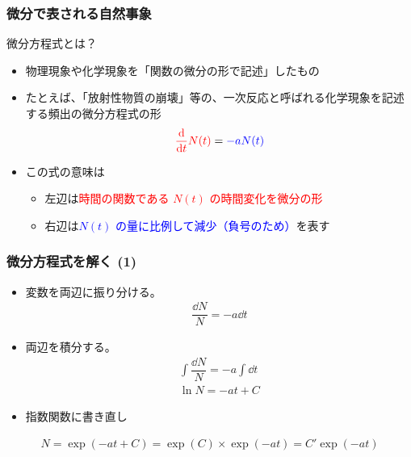 \documentclass[unicode,12pt,aspectratio=169]{beamer}
\begin{document}
\begin{frame}
	\frametitle{微分で表される自然事象}
		\vspace{-2mm}
		\begin{alertblock}{微分方程式とは？}
			\begin{itemize}
				\item 物理現象や化学現象を\alert{「関数の微分の形で記述」}したもの
			\end{itemize}
		\end{alertblock}
			\begin{itemize}
				\item<2-> たとえば、「放射性物質の崩壊」等の、一次反応と呼ばれる化学現象を記述する頻出の微分方程式の形
			\vspace{-2mm}
				\small{\begin{align*}
					\textcolor{red}{\dv{t} N(t)} = \textcolor{blue}{-aN(t)}
				\end{align*}}
				\vspace{-6mm}
				\item<3-> この式の意味は
				\begin{itemize}
					\item 左辺は\textcolor{red}{時間の関数である $N(t)$ の時間変化を微分の形}
					\item 右辺は\textcolor{blue}{$N(t)$ の量に比例して減少（負号のため）}を表す
				\end{itemize}
			\end{itemize}
		
		\vspace{2mm}
		\centering
\end{frame}

\begin{frame}
	\frametitle{微分方程式を解く (1)}
			\begin{itemize}
				\item 変数を両辺に振り分ける。
			\vspace{-3mm}
				\begin{align*}
					\dfrac{\dd N}{N} = -a\dd  t
				\end{align*}
			\vspace{-8mm}
				\item 両辺を積分する。
			\vspace{-3mm}
				\begin{align*}
					\int \dfrac{\dd N}{N} = -a \int \dd  t \\
					\ln N = -at + C
				\end{align*}
			\vspace{-8mm}
				\item 指数関数に書き直し
			\end{itemize}
			\vspace{-3mm}
				\begin{align*}
					N=\exp(-at + C) = \exp(C) \times \exp(-at) = C' \exp(-at)
				\end{align*}
\end{frame}
\end{document}

